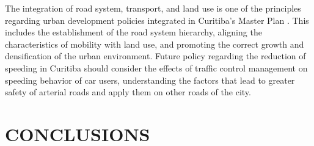 The integration of road system, transport, and land use is one of the principles regarding urban development policies integrated in Curitiba's Master Plan \cite{Curitiba2015}. This includes the establishment of the road system hierarchy, aligning the characteristics of mobility with land use, and promoting the correct growth and densification of the urban environment. Future policy regarding the reduction of speeding in Curitiba should consider the effects of traffic control management on speeding behavior of car users, understanding the factors that lead to greater safety of arterial roads and apply them on other roads of the city.


\chapter{CONCLUSIONS} \label{cap:conclusion}














